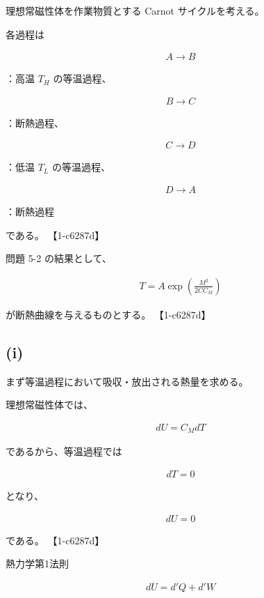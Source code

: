 \documentclass[platex,dvipdfmx,a4paper]{jsarticle}
\begin{document}
理想常磁性体を作業物質とする Carnot サイクルを考える。

各過程は

\begin{align*}
A\to B
\end{align*}

：高温 $T_H$ の等温過程、

\begin{align*}
B\to C
\end{align*}

：断熱過程、

\begin{align*}
C\to D
\end{align*}

：低温 $T_L$ の等温過程、

\begin{align*}
D\to A
\end{align*}

：断熱過程

である。 【1-c6287d】

問題 5-2 の結果として、

\begin{align*}
T
=
A
\exp\left(
\frac{M^2}{2CC_M}
\right)
\end{align*}

が断熱曲線を与えるものとする。 【1-c6287d】

\subsection{(i)}

まず等温過程において吸収・放出される熱量を求める。

理想常磁性体では、

\begin{align*}
dU=C_MdT
\end{align*}

であるから、等温過程では

\begin{align*}
dT=0
\end{align*}

となり、

\begin{align*}
dU=0
\end{align*}

である。 【1-c6287d】

熱力学第1法則

\begin{align*}
dU=d'Q+d'W
\end{align*}
\end{document}
